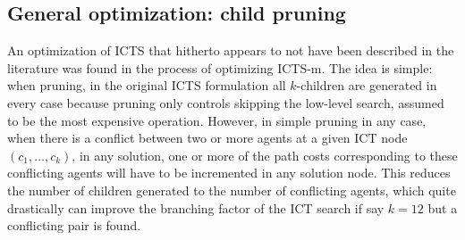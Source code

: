 \documentclass[english]{article}
\begin{document}
	\subsection{General optimization: child pruning}
	An optimization of ICTS that hitherto appears to not have been described in the literature was found in the process of optimizing ICTS-m. The idea is simple: when pruning, in the original ICTS formulation all $k$-children are generated in every case because pruning only controls skipping the low-level search, assumed to be the most expensive operation. However, in simple pruning in any case, when there is a conflict between two or more agents at a given ICT node $(c_1,\ldots,c_k)$, in any solution, one or more of the path costs corresponding to these conflicting agents will have to be incremented in any solution node. This reduces the number of children generated to the number of conflicting agents, which quite drastically can improve the branching factor of the ICT search if say $k = 12$ but a conflicting pair is found.
	
\end{document}
